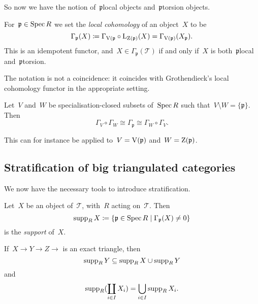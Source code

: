 \documentclass[10pt,a4paper]{article}
\begin{document}
So now we have the notion of~$\mathfrak{p}$\dash local objects and~$\mathfrak{p}$\dash torsion objects.

\begin{definition}
  For~$\mathfrak{p}\in\operatorname{Spec} R$ we set the \emph{local cohomology} of an object~$X$ to be
  \begin{equation}
    \Gamma_{\mathfrak{p}}(X)\coloneqq\Gamma_{\operatorname{V}(\mathfrak{p}}\circ\operatorname{L}_{\operatorname{Z}(\mathfrak{p})}(X)=\Gamma_{\operatorname{V}(\mathfrak{p})}(X_{\mathfrak{p}}).
  \end{equation}
  This is an idempotent functor, and~$X\in\Gamma_{\mathfrak{p}}(\mathcal{T})$ if and only if~$X$ is both~$\mathfrak{p}$\dash local and~$\mathfrak{p}$\dash torsion.
\end{definition}

\begin{remark}
  The notation is not a coincidence: it coincides with Grothendieck's local cohomology functor in the appropriate setting.
\end{remark}

\begin{lemma}
  Let~$V$ and~$W$ be specialisation-closed subsets of~$\operatorname{Spec} R$ such that~$V\setminus W=\{\mathfrak{p}\}$. Then
  \begin{equation}
    \Gamma_V\circ\Gamma_W\cong\Gamma_{\mathfrak{p}}\cong\Gamma_W\circ\Gamma_V.
  \end{equation}
\end{lemma}
This can for instance be applied to~$V=\operatorname{V}(\mathfrak{p})$ and~$W=\operatorname{Z}(\mathfrak{p})$.

\subsection{Stratification of big triangulated categories}
We now have the necessary tools to introduce stratification.
\begin{definition}
  Let~$X$ be an object of~$\mathcal{T}$, with~$R$ acting on~$\mathcal{T}$. Then
  \begin{equation}
    \operatorname{supp}_R X\coloneqq\left\{ \mathfrak{p}\in\operatorname{Spec} R\mid\Gamma_{\mathfrak{p}}(X)\neq 0 \right\}
  \end{equation}
  is the \emph{support} of~$X$.
\end{definition}
\begin{remark}
  If~$X\to Y\to Z\to$ is an exact triangle, then
  \begin{equation}
    \operatorname{supp}_R Y\subseteq\operatorname{supp}_R X\cup\operatorname{supp}_R Y
  \end{equation}
  and
  \begin{equation}
    \operatorname{supp}_R(\coprod_{i\in I}X_i)=\bigcup_{i\in I}\operatorname{supp}_R X_i.
  \end{equation}
\end{remark}
\end{document}
